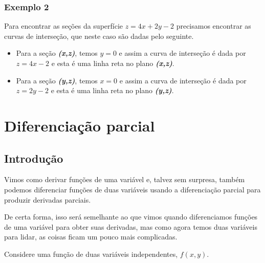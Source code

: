 \documentclass[a4paper]{article}
\begin{document}
\subsubsection*{Exemplo 2}
Para encontrar as seções da superfície $z = 4x + 2y - 2$ precisamos encontrar as curvas de interseção, que neste caso são dadas pelo seguinte.
\begin{itemize}
    \item Para a seção \textit{\textbf{(x,z)}}, temos $y = 0$ e assim a curva de interseção é dada por $z = 4x - 2$ e esta é uma linha reta no plano \textit{\textbf{(x,z)}}.
    \item Para a seção \textit{\textbf{(y,z)}}, temos $x = 0$ e assim a curva de interseção é dada por $z = 2y - 2$ e esta é uma linha reta no plano \textit{\textbf{(y,z)}}.
\end{itemize}
\begin{figure}[h!]
    \centering
\end{figure}
\section{Diferenciação parcial}
\subsection*{Introdução}
Vimos como derivar funções de uma variável e, talvez sem surpresa, também podemos diferenciar funções de duas variáveis usando a diferenciação parcial para produzir derivadas parciais.

\par De certa forma, isso será semelhante ao que vimos quando diferenciamos funções de uma variável para obter suas derivadas, mas como agora temos duas variáveis para lidar, as coisas ficam um pouco mais complicadas.
\par Considere uma função de duas variáveis independentes, $f(x,y)$.
\end{document}
